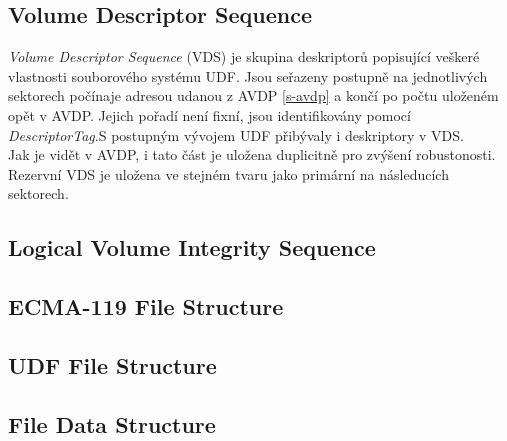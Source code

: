 \subsection{Volume Descriptor Sequence}
\textit{Volume Descriptor Sequence} (VDS) je skupina deskriptorů popisující veškeré vlastnosti souborového systému UDF. Jsou seřazeny postupně na jednotlivých sektorech počínaje adresou udanou z AVDP \ref{s-avdp} a končí po počtu uloženém opět v AVDP. Jejich pořadí není fixní, jsou identifikovány pomocí \textit{DescriptorTag}.S postupným vývojem UDF přibývaly i deskriptory v VDS.\\
Jak je vidět v AVDP, i tato část je uložena duplicitně pro zvýšení robustonosti. Rezervní VDS je uložena ve stejném tvaru jako primární na následucích sektorech.

\subsection{Logical Volume Integrity Sequence}

\subsection{ECMA-119 File Structure}

\subsection{UDF File Structure}

\subsection{File Data Structure}


